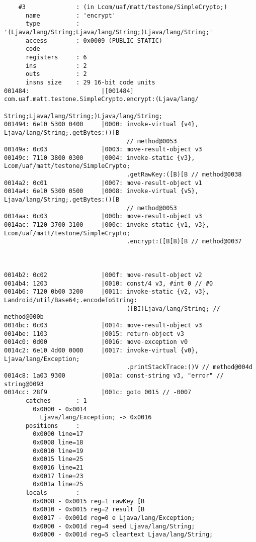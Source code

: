 \begin{lstlisting}
    #3              : (in Lcom/uaf/matt/testone/SimpleCrypto;)
      name          : 'encrypt'
      type          : '(Ljava/lang/String;Ljava/lang/String;)Ljava/lang/String;'
      access        : 0x0009 (PUBLIC STATIC)
      code          -
      registers     : 6
      ins           : 2
      outs          : 2
      insns size    : 29 16-bit code units
001484:                    |[001484] com.uaf.matt.testone.SimpleCrypto.encrypt:(Ljava/lang/
                                     String;Ljava/lang/String;)Ljava/lang/String;
001494: 6e10 5300 0400     |0000: invoke-virtual {v4}, Ljava/lang/String;.getBytes:()[B
                                  // method@0053
00149a: 0c03               |0003: move-result-object v3
00149c: 7110 3800 0300     |0004: invoke-static {v3}, Lcom/uaf/matt/testone/SimpleCrypto;
                                  .getRawKey:([B)[B // method@0038
0014a2: 0c01               |0007: move-result-object v1
0014a4: 6e10 5300 0500     |0008: invoke-virtual {v5}, Ljava/lang/String;.getBytes:()[B
                                  // method@0053
0014aa: 0c03               |000b: move-result-object v3
0014ac: 7120 3700 3100     |000c: invoke-static {v1, v3}, Lcom/uaf/matt/testone/SimpleCrypto;
                                  .encrypt:([B[B)[B // method@0037



0014b2: 0c02               |000f: move-result-object v2
0014b4: 1203               |0010: const/4 v3, #int 0 // #0
0014b6: 7120 0b00 3200     |0011: invoke-static {v2, v3}, Landroid/util/Base64;.encodeToString:
                                  ([BI)Ljava/lang/String; // method@000b
0014bc: 0c03               |0014: move-result-object v3
0014be: 1103               |0015: return-object v3
0014c0: 0d00               |0016: move-exception v0
0014c2: 6e10 4d00 0000     |0017: invoke-virtual {v0}, Ljava/lang/Exception;
                                  .printStackTrace:()V // method@004d
0014c8: 1a03 9300          |001a: const-string v3, "error" // string@0093
0014cc: 28f9               |001c: goto 0015 // -0007
      catches       : 1
        0x0000 - 0x0014
          Ljava/lang/Exception; -> 0x0016
      positions     :
        0x0000 line=17
        0x0008 line=18
        0x0010 line=19
        0x0015 line=25
        0x0016 line=21
        0x0017 line=23
        0x001a line=25
      locals        :
        0x0008 - 0x0015 reg=1 rawKey [B
        0x0010 - 0x0015 reg=2 result [B
        0x0017 - 0x001d reg=0 e Ljava/lang/Exception;
        0x0000 - 0x001d reg=4 seed Ljava/lang/String;
        0x0000 - 0x001d reg=5 cleartext Ljava/lang/String;


\end{lstlisting}
